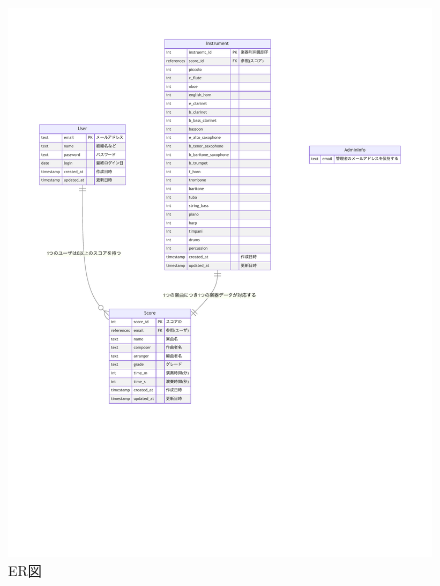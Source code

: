 \begin{figure}[p]
    \centering
    \includegraphics[keepaspectratio,width=\textwidth]{db-nwDesign/er.pdf}
    \caption{ER図}
    \label{fig:ER図}
\end{figure}
